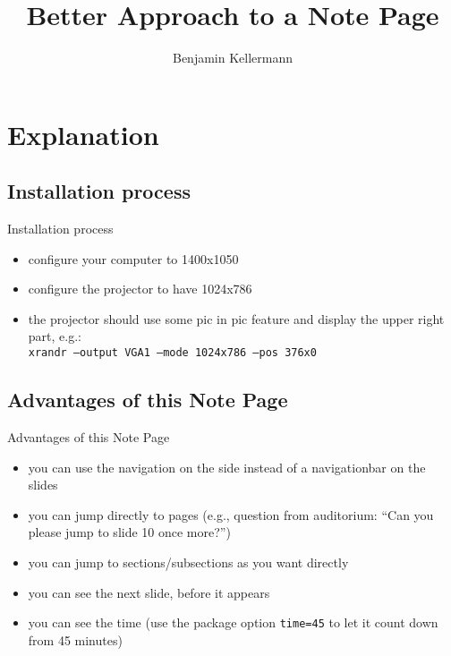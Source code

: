 \documentclass{beamer}
\title{Better Approach to a Note Page}
\author{Benjamin Kellermann}
\institute[TUD]{Technische Universit\"{a}t Dresden}
\begin{document}
\maketitle
{}
\section{Explanation}
\subsection{Installation process}
\begin{frame}{Installation process}%
	\begin{itemize}[<+->]
		\item configure your computer to 1400x1050
		\item configure the projector to have 1024x786
		\item the projector should use some pic in pic feature and display the upper right part, e.g.:\\
		\texttt{xrandr --output VGA1 --mode 1024x786 --pos 376x0}
	\end{itemize}
\end{frame}
\subsection{Advantages of this Note Page}
\begin{frame}{Advantages of this Note Page}
	\begin{itemize}
		\item you can use the navigation on the side instead of a navigationbar on the slides
		\item you can jump directly to pages (e.g., question from auditorium: ``Can you please jump to slide 10 once more?'')
		\item you can jump to sections/subsections as you want directly
		\item you can see the next slide, before it appears
		\item you can see the time (use the package option \texttt{time=45} to let it count down from 45 minutes)
	\end{itemize}
\end{frame}
\end{document}
